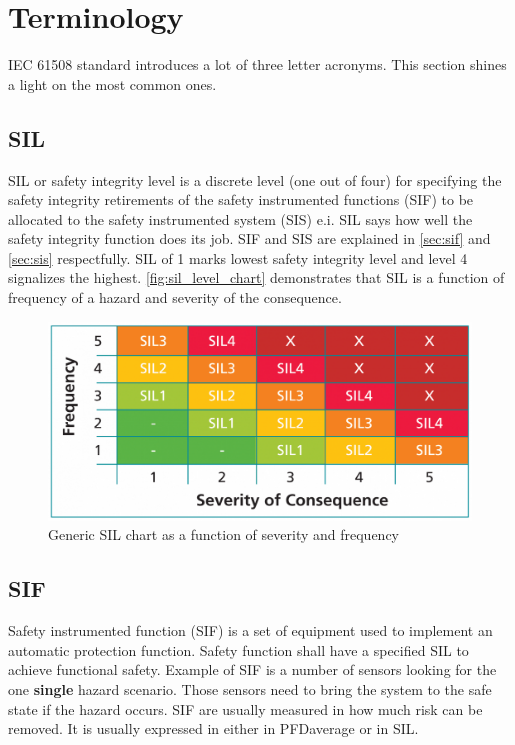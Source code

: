 \section{Terminology}

IEC 61508 standard introduces a lot of three letter acronyms. This section shines a light on the most common ones.

\subsection{SIL}

SIL or safety integrity level is a discrete level (one out of four) for specifying the safety integrity retirements of the safety instrumented functions (SIF) to be allocated to the safety instrumented system (SIS) e.i. SIL says how well the safety integrity function does its job. SIF and SIS are explained in \autoref{sec:sif}  and \autoref{sec:sis} respectfully. SIL of 1 marks lowest safety integrity level and level 4 signalizes the highest.  \autoref{fig:sil_level_chart} demonstrates that SIL is a function of frequency of a hazard and severity of the consequence. 


\begin{figure}[H]

      \centering
      \includegraphics[width=0.7\linewidth]{images/sil_level_chart.png}
      \caption{Generic SIL chart as a function of severity and frequency}
      \label{fig:sil_level_chart}
    
\end{figure}

\subsection{SIF}
\label{sec:sif}

Safety instrumented function (SIF) is a set of equipment used to implement an automatic protection function. Safety function shall have a specified SIL to achieve functional safety. 
Example of SIF is a number of sensors looking for the one \textbf{single} hazard scenario. Those sensors need to bring the system to the safe state if the hazard occurs. SIF are usually measured in how much risk can be removed. It is usually expressed in either in PFDaverage or in SIL. 

